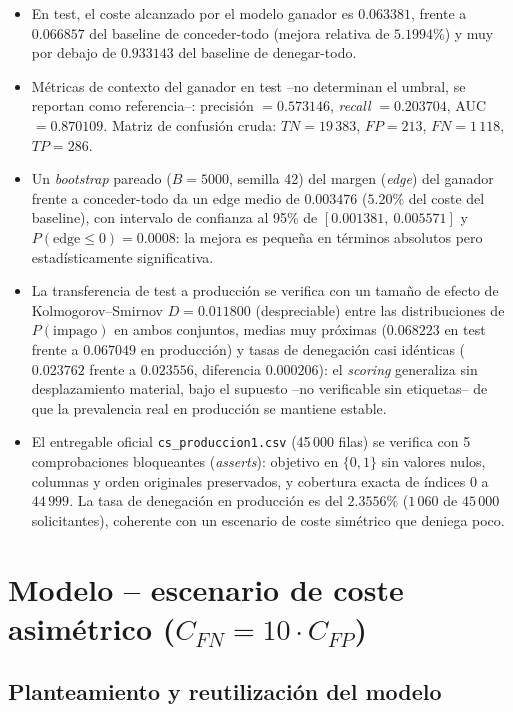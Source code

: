 \documentclass[11pt,a4paper]{article}
\begin{document}
\begin{itemize}
\item En test, el coste alcanzado por el modelo ganador es $0.063381$, frente a $0.066857$ del
baseline de conceder-todo (mejora relativa de $5.1994\%$) y muy por debajo de $0.933143$ del
baseline de denegar-todo.
\item M\'etricas de contexto del ganador en test --no determinan el umbral, se reportan como
referencia--: precisi\'on $=0.573146$, \emph{recall} $=0.203704$, AUC $=0.870109$. Matriz de
confusi\'on cruda: $TN=19\,383$, $FP=213$, $FN=1\,118$, $TP=286$.
\item Un \emph{bootstrap} pareado ($B=5000$, semilla 42) del margen (\emph{edge}) del ganador frente a
conceder-todo da un edge medio de $0.003476$ ($5.20\%$ del coste del baseline), con intervalo de
confianza al 95\% de $[0.001381,\ 0.005571]$ y $P(\text{edge}\leq 0)=0.0008$: la mejora es peque\~na
en t\'erminos absolutos pero estad\'isticamente significativa.
\item La transferencia de test a producci\'on se verifica con un tama\~no de efecto de
Kolmogorov--Smirnov $D=0.011800$ (despreciable) entre las distribuciones de $P(\text{impago})$ en
ambos conjuntos, medias muy pr\'oximas ($0.068223$ en test frente a $0.067049$ en producci\'on) y
tasas de denegaci\'on casi id\'enticas ($0.023762$ frente a $0.023556$, diferencia $0.000206$): el
\emph{scoring} generaliza sin desplazamiento material, bajo el supuesto --no verificable sin
etiquetas-- de que la prevalencia real en producci\'on se mantiene estable.
\item El entregable oficial \texttt{cs\_produccion1.csv} (45\,000 filas) se verifica con 5
comprobaciones bloqueantes (\emph{asserts}): objetivo en $\{0,1\}$ sin valores nulos, columnas y orden
originales preservados, y cobertura exacta de \'indices $0$ a $44\,999$. La tasa de denegaci\'on en
producci\'on es del $2.3556\%$ ($1\,060$ de $45\,000$ solicitantes), coherente con un escenario de
coste sim\'etrico que deniega poco.
\end{itemize}

\section{Modelo -- escenario de coste asim\'etrico ($C_{FN} = 10\cdot C_{FP}$)}

\subsection{Planteamiento y reutilizaci\'on del modelo}
\end{document}
